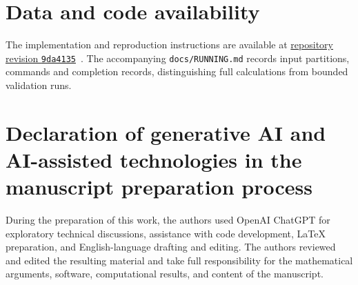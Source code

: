\documentclass[11pt]{article}
\theoremstyle{definition}
\theoremstyle{plain}
\begin{document}
\section*{Data and code availability}
The implementation and reproduction instructions are available at
\href{https://github.com/dongxuelian2/cerny-direct-attack/tree/9da41353adb79b495e13aa4e4300297371452c26}{repository revision \texttt{9da4135}}~\cite{code}.
The accompanying \texttt{docs/RUNNING.md} records input partitions,
commands and completion records, distinguishing full calculations from
bounded validation runs.

\section*{Declaration of generative AI and AI-assisted technologies in the manuscript preparation process}
During the preparation of this work, the authors used OpenAI ChatGPT for
exploratory technical discussions, assistance with code development,
LaTeX preparation, and English-language drafting and editing. The authors
reviewed and edited the resulting material and take full responsibility
for the mathematical arguments, software, computational results, and
content of the manuscript.



\end{document}
